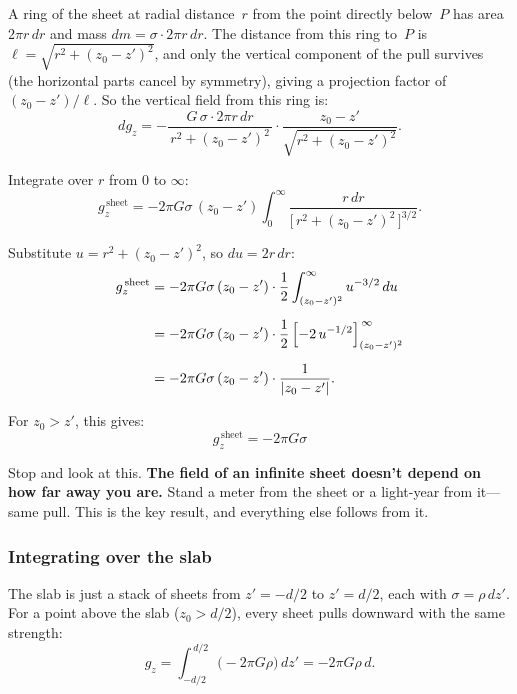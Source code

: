 \documentclass[11pt, letterpaper]{article}
\begin{document}
A ring of the sheet at radial distance~$r$ from the point directly below~$P$ has area $2\pi r \, dr$ and mass $dm = \sigma \cdot 2\pi r \, dr$. The distance from this ring to~$P$ is $\ell = \sqrt{r^2 + (z_0 - z')^2}$, and only the vertical component of the pull survives (the horizontal parts cancel by symmetry), giving a projection factor of $(z_0 - z')/\ell$. So the vertical field from this ring is:
\begin{equation}
  dg_z = -\frac{G \, \sigma \cdot 2\pi r \, dr}{\,r^2 + (z_0 - z')^2\,} \cdot \frac{z_0 - z'}{\sqrt{r^2 + (z_0 - z')^2}}.
\end{equation}

Integrate over $r$ from $0$ to $\infty$:
\begin{equation}
  g_z^{\,\text{sheet}} = -2\pi G \sigma \,(z_0 - z') \int_0^\infty \frac{r \, dr}{\bigl[\,r^2 + (z_0 - z')^2\,\bigr]^{3/2}}.
\end{equation}

Substitute $u = r^2 + (z_0 - z')^2$, so $du = 2r\,dr$:
\begin{align}
  g_z^{\,\text{sheet}} &= -2\pi G \sigma \,(z_0 - z') \cdot \frac{1}{2} \int_{(z_0 - z')^2}^{\infty} u^{-3/2}\,du \notag \\[6pt]
  &= -2\pi G \sigma \,(z_0 - z') \cdot \frac{1}{2} \left[-2\,u^{-1/2}\right]_{(z_0-z')^2}^{\,\infty} \notag \\[6pt]
  &= -2\pi G \sigma \,(z_0 - z') \cdot \frac{1}{|z_0 - z'|}.
\end{align}

For $z_0 > z'$, this gives:
\begin{equation}
  \boxed{\;g_z^{\,\text{sheet}} = -2\pi G \sigma\;}
  \label{eq:sheet}
\end{equation}

Stop and look at this. \textbf{The field of an infinite sheet doesn't depend on how far away you are.} Stand a meter from the sheet or a light-year from it---same pull. This is the key result, and everything else follows from it.

\subsubsection{Integrating over the slab}

The slab is just a stack of sheets from $z' = -d/2$ to $z' = d/2$, each with $\sigma = \rho \, dz'$. For a point above the slab ($z_0 > d/2$), every sheet pulls downward with the same strength:
\begin{equation}
  g_z = \int_{-d/2}^{\,d/2} \!\bigl(-2\pi G \rho\bigr)\,dz' = -2\pi G \rho \, d.
\end{equation}
\end{document}
